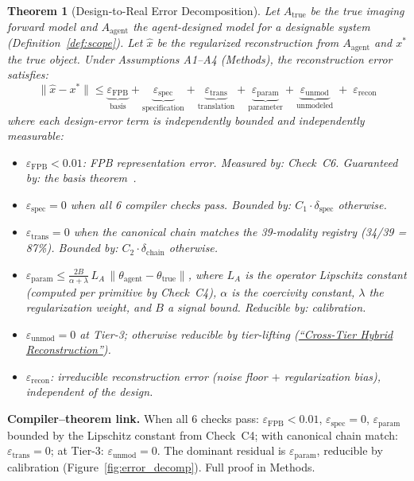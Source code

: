 \documentclass[11pt,a4paper]{article}
\newtheorem{theorem}{Theorem}
\newcommand{\eps}{\varepsilon}
\newcommand{\Atrue}{A_{\text{true}}}
\newcommand{\Aagent}{A_{\text{agent}}}
\begin{document}
\begin{mdframed}[style=theorembox]
\begin{theorem}[Design-to-Real Error Decomposition]
\label{thm:design}
Let $\Atrue$ be the true imaging forward model and $\Aagent$ the agent-designed model for a designable system (Definition~\ref{def:scope}).  Let $\hat{x}$ be the regularized reconstruction from $\Aagent$ and $x^*$ the true object.  Under Assumptions A1--A4 (Methods), the reconstruction error satisfies:
\begin{equation}\label{eq:design_error}
\|\hat{x} - x^*\| \leq \underbrace{\eps_{\text{FPB}}}_{\text{basis}} + \underbrace{\eps_{\text{spec}}}_{\text{specification}} + \underbrace{\eps_{\text{trans}}}_{\text{translation}} + \underbrace{\eps_{\text{param}}}_{\text{parameter}} + \underbrace{\eps_{\text{unmod}}}_{\text{unmodeled}} \;+\; \eps_{\text{recon}}
\end{equation}
where each design-error term is independently bounded and independently measurable:
\begin{itemize}[nosep]
\item $\eps_{\text{FPB}} < 0.01$: FPB representation error.  \emph{Measured by}: Check~C6.  \emph{Guaranteed by}: the basis theorem~\cite{paperII}.
\item $\eps_{\text{spec}} = 0$ when all 6 compiler checks pass.  \emph{Bounded by}: $C_1 \cdot \delta_{\text{spec}}$ otherwise.
\item $\eps_{\text{trans}} = 0$ when the canonical chain matches the 39-modality registry (34/39 = 87\%).  \emph{Bounded by}: $C_2 \cdot \delta_{\text{chain}}$ otherwise.
\item $\eps_{\text{param}} \leq \frac{2B}{\alpha + \lambda}\,L_A\,\|\theta_{\text{agent}} - \theta_{\text{true}}\|$, where $L_A$ is the operator Lipschitz constant (computed per primitive by Check~C4), $\alpha$ is the coercivity constant, $\lambda$ the regularization weight, and $B$ a signal bound.  \emph{Reducible by}: calibration.
\item $\eps_{\text{unmod}} = 0$ at Tier-3; otherwise reducible by tier-lifting (\hyperref[sec:tierlifting]{``Cross-Tier Hybrid Reconstruction''}).
\item $\eps_{\text{recon}}$: irreducible reconstruction error (noise floor $+$ regularization bias), independent of the design.
\end{itemize}
\end{theorem}
\end{mdframed}

\textbf{Compiler--theorem link.}
When all 6 checks pass: $\eps_{\text{FPB}} < 0.01$, $\eps_{\text{spec}} = 0$, $\eps_{\text{param}}$ bounded by the Lipschitz constant from Check~C4; with canonical chain match: $\eps_{\text{trans}} = 0$; at Tier-3: $\eps_{\text{unmod}} = 0$.  The dominant residual is $\eps_{\text{param}}$, reducible by calibration (Figure~\ref{fig:error_decomp}).  Full proof in Methods.
\end{document}
